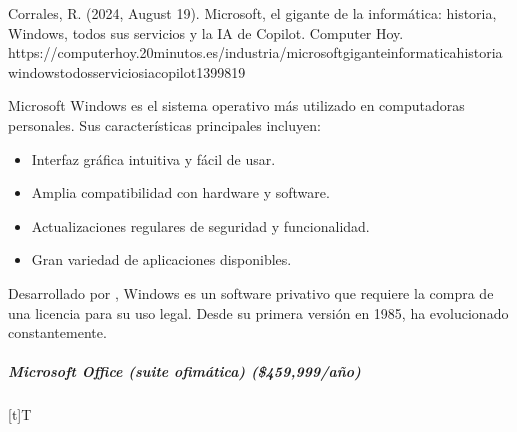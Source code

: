 \documentclass[letterpaper,10pt,spanish]{sphinxmanual}
\let\sphinxpxdimen\pdfpxdimen\else\newdimen\sphinxpxdimen
\begin{document}
\sphinxAtStartPar
%
\begin{footnote}[11]\sphinxAtStartFootnote
Corrales, R. (2024, August 19). Microsoft, el gigante de la informática: historia, Windows, todos sus servicios y la IA de Copilot. Computer Hoy. https://computerhoy.20minutos.es/industria/microsoft\sphinxhyphen{}gigante\sphinxhyphen{}informatica\sphinxhyphen{}historia\sphinxhyphen{}windows\sphinxhyphen{}todos\sphinxhyphen{}servicios\sphinxhyphen{}ia\sphinxhyphen{}copilot\sphinxhyphen{}1399819
%
\end{footnote} Microsoft Windows es el sistema operativo más utilizado en computadoras personales. Sus características principales incluyen:
\begin{itemize}
\item {} 
\sphinxAtStartPar
Interfaz gráfica intuitiva y fácil de usar.

\item {} 
\sphinxAtStartPar
Amplia compatibilidad con hardware y software.

\item {} 
\sphinxAtStartPar
Actualizaciones regulares de seguridad y funcionalidad.

\item {} 
\sphinxAtStartPar
Gran variedad de aplicaciones disponibles.

\end{itemize}

\sphinxAtStartPar
Desarrollado por , Windows es un software privativo que requiere la compra de una licencia para su uso legal. Desde su primera versión en 1985, ha evolucionado constantemente.


\subparagraph{Microsoft Office (suite ofimática) (\$459,999/año)}
\label{\detokenize{cursos/ofimatica10/recursos/T02:microsoft-office-suite-ofimatica-459-999-ano}}

\begin{savenotes}\sphinxattablestart
\sphinxthistablewithglobalstyle
\centering
\begin{tabulary}{\linewidth}[t]{T}
\sphinxtoprule
\sphinxtableatstartofbodyhook

\begin{sphinxfigure-in-table}
\centering
\capstart
\noindent\sphinxincludegraphics[width=300\sphinxpxdimen]{{image12}.png}
\label{\detokenize{cursos/ofimatica10/recursos/T02:id44}}\end{sphinxfigure-in-table}\relax
\\
\sphinxbottomrule
\end{tabulary}
\sphinxtableafterendhook\par
\sphinxattableend\end{savenotes}
\end{document}
